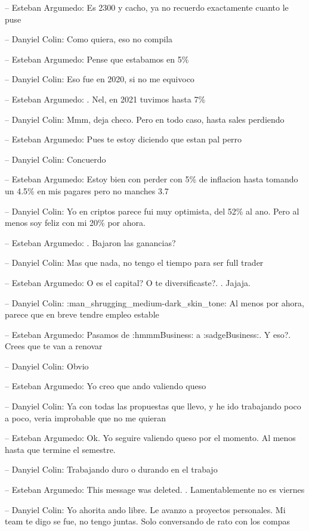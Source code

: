 -- Esteban Argumedo: Es 2300 y cacho, ya no recuerdo exactamente cuanto
le puse

-- Danyiel Colin: Como quiera, eso no compila

-- Esteban Argumedo: Pense que estabamos en 5\%

-- Danyiel Colin: Eso fue en 2020, si no me equivoco

-- Esteban Argumedo: . Nel, en 2021 tuvimos hasta 7\%

-- Danyiel Colin: Mmm, deja checo. Pero en todo caso, hasta sales
perdiendo

-- Esteban Argumedo: Pues te estoy diciendo que estan pal perro

-- Danyiel Colin: Concuerdo

-- Esteban Argumedo: Estoy bien con perder con 5\% de inflacion hasta
tomando un 4.5\% en mis pagares pero no manches 3.7

-- Danyiel Colin: Yo en criptos parece fui muy optimista, del 52\% al
ano. Pero al menos soy feliz con mi 20\% por ahora.

-- Esteban Argumedo: . Bajaron las ganancias?

-- Danyiel Colin: Mas que nada, no tengo el tiempo para ser full trader

-- Esteban Argumedo: O es el capital? O te diversificaste?. . Jajaja.

-- Danyiel Colin: :man\_shrugging\_medium-dark\_skin\_tone: Al menos por
ahora, parece que en breve tendre empleo estable

-- Esteban Argumedo: Pasamos de :hmmmBusiness: a :sadgeBusiness:. Y
eso?. Crees que te van a renovar

-- Danyiel Colin: Obvio

-- Esteban Argumedo: Yo creo que ando valiendo queso

-- Danyiel Colin: Ya con todas las propuestas que llevo, y he ido
trabajando poco a poco, veria improbable que no me quieran

-- Esteban Argumedo: Ok. Yo seguire valiendo queso por el momento. Al
menos hasta que termine el semestre.

-- Danyiel Colin: Trabajando duro o durando en el trabajo

-- Esteban Argumedo: This message was deleted. . Lamentablemente no es
viernes

-- Danyiel Colin: Yo ahorita ando libre. Le avanzo a proyectos
personales. Mi team te digo se fue, no tengo juntas. Solo conversando de
rato con los compas

